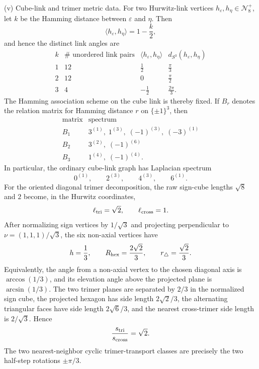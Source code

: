 \documentclass[11pt]{article}
\begin{document}
\begin{theorem}[\(m=1\) finite numerical data]
\smallskip
\noindent\textup{(v) Cube-link and trimer metric data.}
For two Hurwitz-link vertices
\(h_\varepsilon,h_\eta\in\mathcal N_8^+\), let \(k\) be the Hamming distance
between \(\varepsilon\) and \(\eta\).  Then
\[
    \langle h_\varepsilon,h_\eta\rangle=1-\frac{k}{2},
\]
and hence the distinct link angles are
\[
\begin{array}{c|c|c|c}
 k & \#\text{ unordered link pairs} & \langle h_\varepsilon,h_\eta\rangle &
 d_{S^3}(h_\varepsilon,h_\eta)\\
\hline
1 & 12 & \tfrac12 & \tfrac\pi3\\
2 & 12 & 0 & \tfrac\pi2\\
3 & 4 & -\tfrac12 & \tfrac{2\pi}{3}.
\end{array}
\]
The Hamming association scheme on the cube link is thereby fixed.  If \(B_r\)
denotes the relation matrix for Hamming distance \(r\) on \(\{\pm1\}^3\), then
\[
\begin{array}{c|c}
\text{matrix} & \text{spectrum}\\
\hline
B_1 & 3^{(1)},\;1^{(3)},\;(-1)^{(3)},\;(-3)^{(1)}\\
B_2 & 3^{(2)},\;(-1)^{(6)}\\
B_3 & 1^{(4)},\;(-1)^{(4)}.
\end{array}
\]
In particular, the ordinary cube-link graph has Laplacian spectrum
\[
    0^{(1)},\qquad 2^{(3)},\qquad 4^{(3)},\qquad 6^{(1)}.
\]
For the oriented diagonal trimer decomposition, the raw sign-cube lengths
\(\sqrt8\) and \(2\) become, in the Hurwitz coordinates,
\[
    \ell_{\rm tri}=\sqrt2,
    \qquad
    \ell_{\rm cross}=1.
\]
After normalizing sign vertices by \(1/\sqrt3\) and projecting perpendicular to
\(\nu=(1,1,1)/\sqrt3\), the six non-axial vertices have
\[
    h=\frac13,
    \qquad
    R_{\rm hex}=\frac{2\sqrt2}{3},
    \qquad
    r_\triangle=\frac{\sqrt2}{3}.
\]
Equivalently, the angle from a non-axial vertex to the chosen diagonal axis is
\(\arccos(1/3)\), and its elevation angle above the projected plane is
\(\arcsin(1/3)\).  The two trimer planes are separated by \(2/3\) in the
normalized sign cube, the projected hexagon has side length \(2\sqrt2/3\), the
alternating triangular faces have side length \(2\sqrt6/3\), and the nearest
cross-trimer side length is \(2/\sqrt3\).  Hence
\[
    \frac{s_{\rm tri}}{s_{\rm cross}}=\sqrt2.
\]
The two nearest-neighbor cyclic trimer-transport classes are precisely the two
half-step rotations \(\pm\pi/3\).


\end{theorem}
\end{document}
